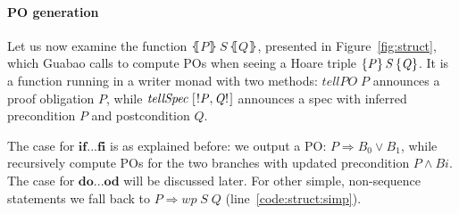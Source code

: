\documentclass[runningheads]{llncs}
\newcommand{\Conid}[1]{\mathit{#1}}
\newcommand{\Varid}[1]{\mathit{#1}}
\let\Varid\mathit
\let\Conid\mathit
\begin{document}
\paragraph{PO generation}
Let us now examine the function \ensuremath{\lBrace\Conid{P}\rBrace\,\Conid{S}\,\lBrace\Conid{Q}\rBrace}, presented in Figure~\ref{fig:struct}, which Guabao calls to compute POs when seeing a Hoare triple \ensuremath{\htriple{\Conid{P}}{\Conid{S}}{\Conid{Q}}}.
It is a function running in a writer monad with two methods:
\ensuremath{\Varid{tellPO}\;\Conid{P}} announces a proof obligation \ensuremath{\Conid{P}}, while \ensuremath{\Varid{tellSpec}\;[\mskip1.5mu \mathbin{!}\Conid{P},\Conid{Q}\mathbin{!}\mskip1.5mu]} announces a spec with inferred precondition \ensuremath{\Conid{P}} and postcondition \ensuremath{\Conid{Q}}.

The case for \ensuremath{\mathbf{if}\mathbin{...}\mathbf{fi}} is as explained before:
we output a PO: \ensuremath{\Conid{P}\mathrel{\Rightarrow}\Conid{B}_{0}\mathrel{\vee}\Conid{B}_{1}}, while recursively compute POs for the two branches with updated precondition \ensuremath{\Conid{P}\mathrel{\wedge}\Conid{Bi}}.
The case for \ensuremath{\mathbf{do}\mathbin{...}\mathbf{od}} will be discussed later.
For other simple, non-sequence statements we fall back to \ensuremath{\Conid{P}\mathrel{\Rightarrow}\Varid{wp}\;\Conid{S}\;\Conid{Q}} (line~\ref{code:struct:simp}).
\end{document}

